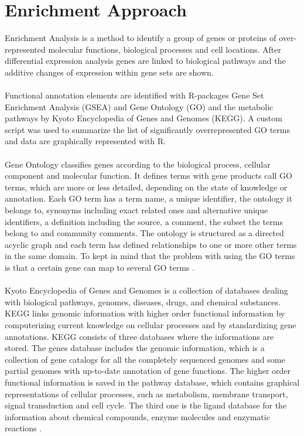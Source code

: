 \documentclass[12pt, a4paper]{report}
\newcommand{\HT}[1]{\textcolor{red}{#1}}
\begin{document}
\section{Enrichment Approach}
Enrichment Analysis is a method to identify a group of genes or proteins of over-represented molecular functions, biological processes and cell locations. After differential expression analysis genes are linked to biological pathways and the additive changes of expression within gene sets are shown.\\
\ \\
Functional annotation elements are identified with R-packages Gene Set Enrichment Analysis (GSEA) \cite{Subramanian2005} and Gene Ontology (GO) and the metabolic pathways by Kyoto Encyclopedia of Genes and Genomes (KEGG). 
A custom script was used to summarize the list of significantly overrepresented GO terms and data are graphically represented with R. \\
\ \\
Gene Ontology classifies genes according to the biological process, cellular component and molecular function. It defines terms with gene products call GO terms, which are more or less detailed, depending on the state of knowledge or annotation. 
Each GO term has a term name, a unique identifier, the ontology it belongs to, synonyms including exact related ones and alternative unique identifiers, a definition including the source, a comment, the subset the terms belong to and community comments. The ontology is structured as a directed acyclic graph and each term has defined relationships to one or more other terms in the same domain. To kept in mind that the problem with using the GO terms is that a certain gene can map to several GO terms \cite{Ashburner2000}. \\
\ \\
Kyoto Encyclopedia of Genes and Genomes is a collection of databases dealing with biological pathways, genomes, diseases, drugs, and chemical substances. KEGG links genomic information with higher order functional information by computerizing current knowledge on cellular processes and by standardizing gene annotations. KEGG consists of three databases where the informations are stored. The genes database includes the genomic information, which is a collection of gene catalogs for all the completely sequenced genomes and some partial genomes with up-to-date annotation of gene functions. The higher order functional information is saved in the pathway database, which contains graphical representations of cellular processes, such as metabolism, membrane transport, signal transduction and cell cycle. The third one is the ligand database for the information about chemical compounds, enzyme molecules and enzymatic reactions \cite{kanehisa2000}. 
\end{document}
